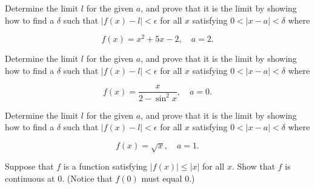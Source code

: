\documentclass[12pt,letterpaper]{hmcpset}
\newcommand{\paren}[1]{\left(#1\right)}
\newcommand{\abs}[1]{\left|#1\right|}
\begin{document}

\begin{problem}[5.3.ii]
    Determine the limit $l$ for the given $a$, and prove that it is the limit by showing how to find a $\delta$ such that $\abs{f\paren{x} - l} < \epsilon$ for all $x$ satisfying $0 < \abs{x - a} < \delta$ where

    \[
        f\paren{x} = x^2 + 5x - 2,\quad a = 2.
    \]
\end{problem}

\begin{solution}

\end{solution}
\newpage

\begin{problem}[5.3.vi]
    Determine the limit $l$ for the given $a$, and prove that it is the limit by showing how to find a $\delta$ such that $\abs{f\paren{x} - l} < \epsilon$ for all $x$ satisfying $0 < \abs{x - a} < \delta$ where

    \[
        f\paren{x} = \frac{x}{2 - \sin^2 x},\quad a = 0.
    \]
\end{problem}

\begin{solution}

\end{solution}
\newpage

\begin{problem}[5.3.viii]
    Determine the limit $l$ for the given $a$, and prove that it is the limit by showing how to find a $\delta$ such that $\abs{f\paren{x} - l} < \epsilon$ for all $x$ satisfying $0 < \abs{x - a} < \delta$ where

    \[
        f\paren{x} = \sqrt{x},\quad a = 1.
    \]
\end{problem}

\begin{solution}

\end{solution}
\newpage

\begin{problem}[6.3.a]
    Suppose that $f$ is a function satisfying $\abs{f\paren{x}} \le \abs{x}$ for all $x$. Show that $f$ is continuous at $0$. (Notice that $f\paren{0}$ must equal $0$.)
\end{problem}

\begin{solution}

\end{solution}
\newpage
\end{document}
